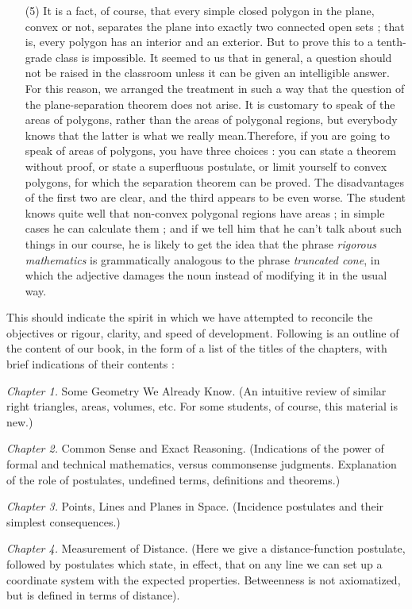 \begin{itemize}
\item[(5)] It is a fact, of course, that every simple closed polygon
  in the plane, convex or not, separates the plane into exactly two
  connected open sets ; that is, every polygon has an interior and an
  exterior. But to prove this to a tenth-grade class is impossible. It
  seemed to us that in general, a question should not be raised in the
  classroom unless it can be given an intelligible answer. For this
  reason, we arranged the treatment in such a way that the question
  of the plane-separation theorem does not arise. It is customary to
  speak of the areas of polygons, rather than the areas of polygonal
  regions, but everybody knows that the latter is what we really
  mean.\pageoriginale Therefore, if you are going to speak of areas of
  polygons, you have three choices : you can state a theorem without
  proof, or state a superfluous postulate, or limit yourself to convex
  polygons, for which the separation theorem can be proved. The
  disadvantages of the first two are clear, and the third appears to
  be even worse. The student knows quite well that non-convex
  polygonal regions have areas ; in simple cases he can calculate them
  ; and if we tell him that he can't talk about such things in our
  course, he is likely to get the idea that the phrase
  \textit{rigorous mathematics} is grammatically analogous to the
  phrase \textit{truncated cone}, in which the adjective damages the
  noun instead of modifying it in the usual way.
\end{itemize}

This should indicate the spirit in which we have attempted to
reconcile the objectives or rigour, clarity, and speed of
development. Following is an outline of the content of our book, in
the form of a list of the titles of the chapters, with brief
indications of their contents :

\smallskip
\textit{Chapter 1.} Some Geometry We Already Know. (An intuitive
review of similar right triangles, areas, volumes, etc. For some
students, of course, this material is new.)

\smallskip
\textit{Chapter 2.} Common Sense and Exact Reasoning. (Indications of
the power of formal and technical mathematics, versus commonsense
judgments. Explanation of the role of postulates, undefined terms,
definitions and theorems.)

\smallskip
\textit{Chapter 3.} Points, Lines and Planes in Space. (Incidence
postulates and their simplest consequences.)

\smallskip
\textit{Chapter 4.} Measurement of Distance. (Here we give a
distance-function postulate, followed by postulates which state, in
effect, that on any line we can set up a coordinate system with the
expected properties. Betweenness is not axiomatized, but is defined
in terms of distance).

